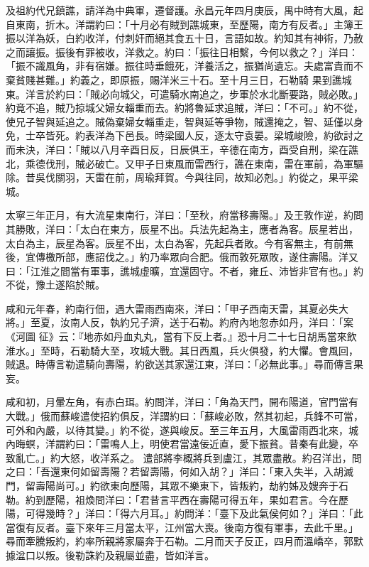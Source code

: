 \begin{pinyinscope}
 及祖約代兄鎮譙，請洋為中典軍，遷督護。永昌元年四月庚辰，禺中時有大風，起自東南，折木。洋謂約曰：「十月必有賊到譙城東，至歷陽，南方有反者。」主簿王振以洋為妖，白約收洋，付刺奸而絕其食五十日，言語如故。約知其有神術，乃赦之而讓振。振後有罪被收，洋救之。約曰：「振往日相繫，今何以救之？」洋曰：「振不識風角，非有宿嫌。振往時垂餓死，洋養活之，振猶尚遺忘。夫處富貴而不棄貧賤甚難。」約義之，即原振，賜洋米三十石。至十月三日，石勒騎
 果到譙城東。洋言於約曰：「賊必向城父，可遣騎水南追之，步軍於水北斷要路，賊必敗。」約竟不追，賊乃掠城父婦女輜重而去。約將魯延求追賊，洋曰：「不可。」約不從，使兄子智與延追之。賊偽棄婦女輜重走，智與延等爭物，賊還掩之，智、延僅以身免，士卒皆死。約表洋為下邑長。時梁國人反，逐太守袁晏。梁城峻險，約欲討之而未決，洋曰：「賊以八月辛酉日反，日辰俱王，辛德在南方，酉受自刑，梁在譙北，乘德伐刑，賊必破亡。又甲子日東風而雷西行，譙在東南，雷在軍前，為軍驅除。昔吳伐關羽，天雷在前，周瑜拜賀。今與往同，故知必剋。」約從之，果平梁
 城。



 太寧三年正月，有大流星東南行，洋曰：「至秋，府當移壽陽。」及王敦作逆，約問其勝敗，洋曰：「太白在東方，辰星不出。兵法先起為主，應者為客。辰星若出，太白為主，辰星為客。辰星不出，太白為客，先起兵者敗。今有客無主，有前無後，宜傳檄所部，應詔伐之。」約乃率眾向合肥。俄而敦死眾敗，遂住壽陽。洋又曰：「江淮之間當有軍事，譙城虛曠，宜還固守。不者，雍丘、沛皆非官有也。」約不從，豫土遂陷於賊。



 咸和元年春，約南行佃，遇大雷雨西南來，洋曰：「甲子西南天雷，其夏必失大將。」至夏，汝南人反，執約兄子濟，送于石勒。約府內地忽赤如丹，洋曰：「案《河圖
 征》云：『地赤如丹血丸丸，當有下反上者。』恐十月二十七日胡馬當來飲淮水。」至時，石勒騎大至，攻城大戰。其日西風，兵火俱發，約大懼。會風回，賊退。時傳言勒遣騎向壽陽，約欲送其家還江東，洋曰：「必無此事。」尋而傳言果妄。



 咸和初，月暈左角，有赤白珥。約問洋，洋曰：「角為天門，開布陽道，官門當有大戰。」俄而蘇峻遣使招約俱反，洋謂約曰：「蘇峻必敗，然其初起，兵鋒不可當，可外和內嚴，以待其變。」約不從，遂與峻反。至三年五月，大風雷雨西北來，城內晦螟，洋謂約曰：「雷鳴人上，明使君當遠佞近直，愛下振貧。昔秦有此變，卒致亂亡。」約大怒，收洋系之。
 遣部將李概將兵到盧江，其眾盡散。約召洋出，問之曰：「吾還東何如留壽陽？若留壽陽，何如入胡？」洋曰：「東入失半，入胡滅門，留壽陽尚可。」約欲東向歷陽，其眾不樂東下，皆叛約，劫約姊及嫂奔于石勒。約到歷陽，祖煥問洋曰：「君昔言平西在壽陽可得五年，果如君言。今在歷陽，可得幾時？」洋曰：「得六月耳。」約問洋：「臺下及此氣侯何如？」洋曰：「此當復有反者。臺下來年三月當太平，江州當大喪。後南方復有軍事，去此千里。」尋而牽騰叛約，約率所親將家屬奔于石勒。二月而天子反正，四月而溫嶠卒，郭默據湓口以叛。後勒誅約及親屬並盡，皆如洋言。




\end{pinyinscope}
